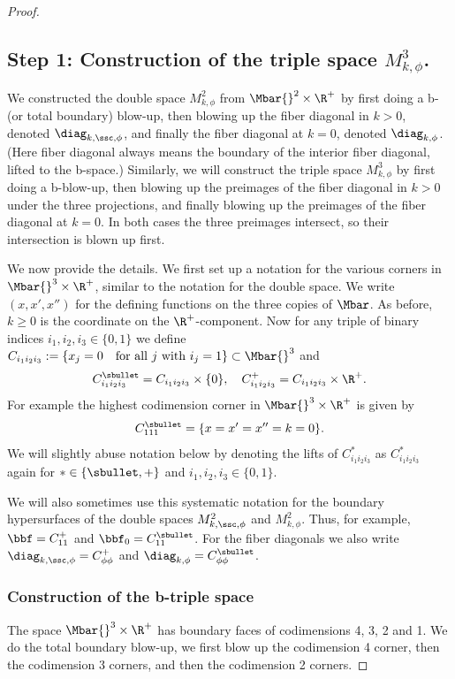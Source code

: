 \begin{proof}
\subsection*{Step 1: Construction of the triple space $M^{3}_{k,\phi}$.}
We constructed the double space $M^2_{k,\phi}$ from $\Mbar{}^2\times\R^+$ by first doing a b- (or total boundary) blow-up, then blowing up the fiber diagonal in $k>0$, denoted $\diag_{k,\ssc,\phi}$, and finally the fiber diagonal at $k=0$, denoted $\diag_{k,\phi}$. (Here fiber diagonal always means the boundary of the interior fiber diagonal, lifted to the b-space.)
Similarly, we will construct the triple space $M^3_{k,\phi}$ by first doing a b-blow-up, then blowing up the preimages of the fiber diagonal in $k>0$ under the three projections, and finally blowing up the preimages of the fiber diagonal at $k=0$. In both cases the three preimages intersect, so their intersection is blown up first.

We now provide the details.
We first set up a notation for the various corners in $\Mbar{}^3\times \R^+$, similar to the notation for the double space. We write $(x,x',x'')$
for the defining functions on the three copies of $\Mbar$. As before, $k\geq 0$ is the coordinate on the
$\R^+$-component.
Now for any triple of binary indices $i_1,i_2,i_3 \in \{0,1\}$ we define
$
C_{i_1i_2i_3} := \{x_j = 0\quad \text{for all $j$ with } i_j = 1\} \subset \Mbar{}^3
$
and
\[
C_{i_1i_2i_3}^\sbullet = C_{i_1i_2i_3}\times \{0\},\quad C_{i_1i_2i_3}^+ = C_{i_1i_2i_3} \times \R^+.
\]
For example the highest codimension corner in $\Mbar{}^3\times \R^+$ is given by
\[
C_{111}^\sbullet = \{ x = x' = x'' = k =0\}.
\]
We will slightly abuse notation below by denoting the lifts of $C_{i_1i_2i_3}^{\ast}$ as $C_{i_1i_2i_3}^{\ast}$ again for $\ast\in\{\sbullet,+\}$ and $i_1,i_2,i_3\in\{0,1\}$.

We will also sometimes use this systematic notation for the boundary hypersurfaces of the double spaces $M^2_{k,\ssc,\phi}$ and $M^2_{k,\phi}$. Thus, for example, $\bbf=C_{11}^+$ and $\bbf_0=C_{11}^\sbullet$. For the fiber diagonals we also write $\diag_{k,\ssc,\phi}=C_{\phi\phi}^+$ and $\diag_{k,\phi}=C_{\phi\phi}^\sbullet$.

\subsubsection* {Construction of the b-triple space}
The space $\Mbar{}^3\times \R^+$ has boundary faces of codimensions 4, 3, 2 and 1. We do the total boundary blow-up, \ie we first blow up the codimension 4 corner, then the codimension 3 corners, and then the codimension 2 corners.


\end{proof}
